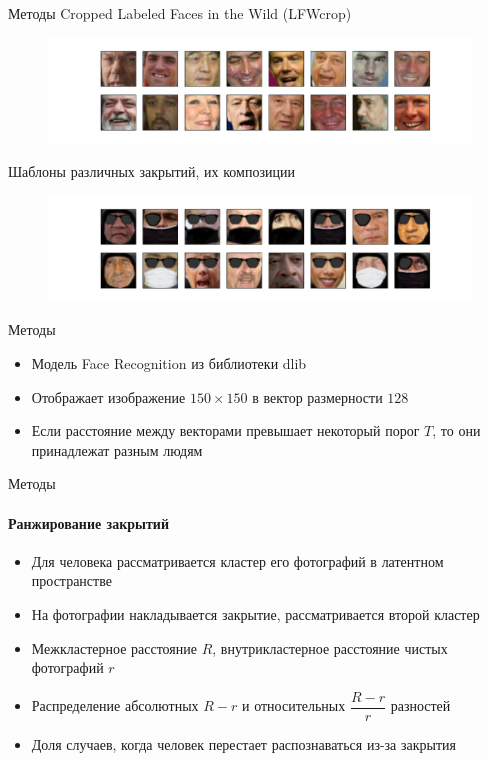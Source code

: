 \documentclass{beamer}
\begin{document}
\begin{frame}{Методы}
Cropped Labeled Faces in the Wild (LFWcrop)

\begin{figure}[h!]
    \centering
    \includegraphics[scale=0.33]{LFWcrop_demo.pdf}
\end{figure}

Шаблоны различных закрытий, их композиции

\begin{figure}[h!]
    \centering
    \includegraphics[scale=0.33]{LFWcropObstr_demo.pdf}
\end{figure}

\end{frame}


\begin{frame}{Методы}
\begin{itemize}
    \item Модель Face Recognition из библиотеки dlib
    \item Отображает изображение $150 \times 150$ в вектор размерности $128$
    \item Если расстояние между векторами превышает некоторый порог $T$, то они принадлежат разным людям
\end{itemize}
\end{frame}


\begin{frame}{Методы}
\framesubtitle{Ранжирование закрытий}
\begin{itemize}
    \item Для человека рассматривается кластер его фотографий в латентном пространстве
    \item На фотографии накладывается закрытие, рассматривается второй кластер
    \item Межкластерное расстояние $R$, внутрикластерное расстояние чистых фотографий $r$
    \item Распределение абсолютных $R-r$ и относительных $\dfrac{R-r}{r}$ разностей
    \item Доля случаев, когда человек перестает распознаваться из-за закрытия
\end{itemize}

\end{frame}
\end{document}
